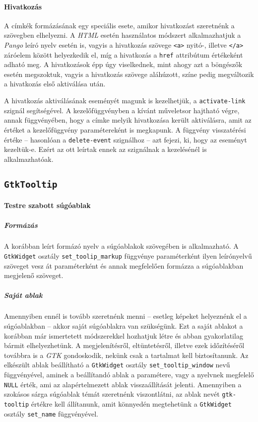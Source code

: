 \paragraph{Hivatkozás}

A címkék formázásának egy speciális esete, amikor hivatkozást szeretnénk a szövegben elhelyezni. A \textit{HTML} esetén használatos módszert alkalmazhatjuk a \textit{Pango} leíró nyelv esetén is, vagyis a hivatkozás szövege \texttt{<a>} nyitó-, illetve \texttt{</a>} záróelem között helyezkedik el, míg a hivatkozás a \texttt{href} attribútum értékeként adható meg. A hivatkozások épp úgy viselkednek, mint ahogy azt a böngészők esetén megszoktuk, vagyis a hivatkozás szövege aláhúzott, színe pedig megváltozik a hivatkozás első aktiválása után.

A hivatkozás aktiválásának eseményét magunk is kezelhetjük, a \texttt{activate-link} szignál segítségével. A kezelőfüggvényben a kívánt műveletsor hajtható végre, annak függvényében, hogy a címke melyik hivatkozása került aktiválásra, amit az értéket a kezelőfüggvény paramétereként is megkapunk. A függvény visszatérési értéke -- hasonlóan a \texttt{delete-event} szignálhoz -- azt fejezi, ki, hogy az eseményt kezeltük-e. Ezért az ott leírtak ennek az szignálnak a kezelésénél is alkalmazhatóak.

\subsection{\texttt{GtkTooltip}}

\paragraph{Testre szabott súgóablak}

\subparagraph{Formázás}

A korábban leírt formázó nyelv a súgóablakok szövegében is alkalmazható. A \texttt{GtkWidget} osztály \texttt{set\_toolip\_markup} függvénye paraméterként ilyen leírónyelvű szöveget vesz át paraméterként és annak megfelelően formázza a súgóablakban megjelenő szöveget.

\subparagraph{Saját ablak}

Amennyiben ennél is tovább szeretnénk menni -- esetleg képeket helyeznénk el a súgóablakban -- akkor saját súgóablakra van szükségünk. Ezt a saját ablakot a korábban már ismertetett módszerekkel hozhatjuk létre és abban gyakorlatilag bármit elhelyezhetünk. A megjelenítésről,  eltüntetésről, illetve ezek időzítéséről továbbra is a \textit{GTK} gondoskodik, nekünk csak a tartalmat kell biztosítanunk. Az elkészült ablak beállítható a \texttt{GtkWidget} osztály \texttt{set\_tooltip\_window} nevű függvényével, aminek a beállítandó ablak a paramétere, vagy a nyelvnek megfelelő \texttt{NULL} érték, ami az alapértelmezett ablak visszaállítását jelenti. Amennyiben a szokásos sárga súgóablak témát szeretnénk viszontlátni, az ablak nevét \texttt{gtk-tooltip} értékre kell állítanunk, amit könnyedén megtehetünk a \texttt{GtkWidget} osztály \texttt{set\_name} függvényével.


